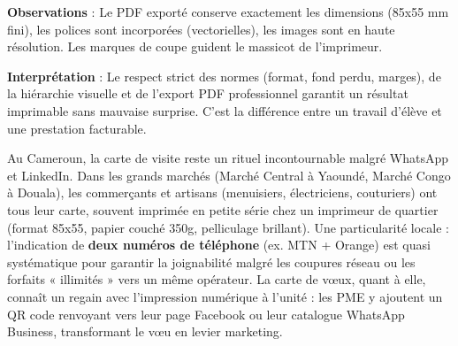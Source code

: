 \documentclass[11pt]{article}
\begin{document}
\begin{experience}
\textbf{Observations} : Le PDF exporté conserve exactement les dimensions (85x55 mm fini), les polices sont incorporées (vectorielles), les images sont en haute résolution. Les marques de coupe guident le massicot de l'imprimeur.

\textbf{Interprétation} : Le respect strict des normes (format, fond perdu, marges), de la hiérarchie visuelle et de l'export PDF professionnel garantit un résultat imprimable sans mauvaise surprise. C'est la différence entre un travail d'élève et une prestation facturable.
\end{experience}

\begin{savaistu}
Au Cameroun, la carte de visite reste un rituel incontournable malgré WhatsApp et LinkedIn. Dans les grands marchés (Marché Central à Yaoundé, Marché Congo à Douala), les commerçants et artisans (menuisiers, électriciens, couturiers) ont tous leur carte, souvent imprimée en petite série chez un imprimeur de quartier (format 85x55, papier couché 350g, pelliculage brillant). Une particularité locale : l'indication de \textbf{deux numéros de téléphone} (ex. MTN + Orange) est quasi systématique pour garantir la joignabilité malgré les coupures réseau ou les forfaits « illimités » vers un même opérateur. La carte de vœux, quant à elle, connaît un regain avec l'impression numérique à l'unité : les PME y ajoutent un QR code renvoyant vers leur page Facebook ou leur catalogue WhatsApp Business, transformant le vœu en levier marketing.
\end{savaistu}
\end{document}
